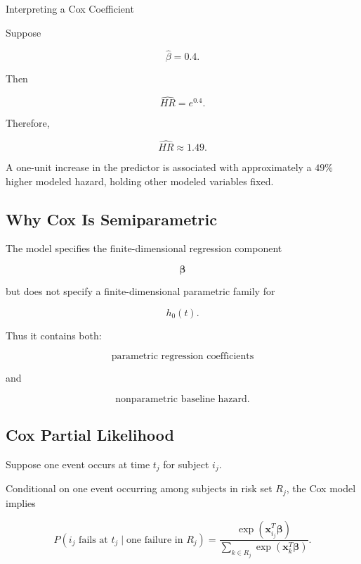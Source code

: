 \begin{workedexamplebox}{Interpreting a Cox Coefficient}

Suppose

\[
\widehat{\beta}=0.4.
\]

Then

\[
\widehat{HR}
=
e^{0.4}.
\]

Therefore,

\begin{answerbox}
\[
\boxed{
\widehat{HR}
\approx
1.49.
}
\]

A one-unit increase in the predictor is associated with approximately a
\(49\%\) higher modeled hazard, holding other modeled variables fixed.
\end{answerbox}

\end{workedexamplebox}

\subsection{Why Cox Is Semiparametric}
\label{subsec:why-cox-semiparametric}

The model specifies the finite-dimensional regression component

\[
\boldsymbol{\beta}
\]

but does not specify a finite-dimensional parametric family for

\[
h_0(t).
\]

Thus it contains both:

\[
\boxed{
\text{parametric regression coefficients}
}
\]

and

\[
\boxed{
\text{nonparametric baseline hazard}.
}
\]

\subsection{Cox Partial Likelihood}
\label{subsec:cox-partial-likelihood}

Suppose one event occurs at time \(t_j\) for subject \(i_j\).

Conditional on one event occurring among subjects in risk set \(R_j\),
the Cox model implies

\[
\boxed{
P
(
i_j
\text{ fails at }t_j
\mid
\text{one failure in }R_j
)
=
\frac{
\exp
(
\mathbf{x}_{i_j}^T
\boldsymbol{\beta}
)
}{
\sum_{k\in R_j}
\exp
(
\mathbf{x}_k^T
\boldsymbol{\beta}
)
}.
}
\]

